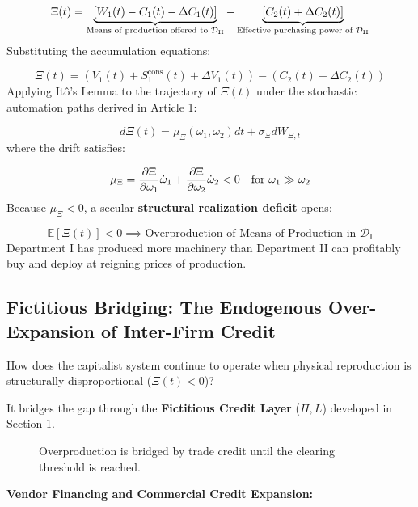\documentclass[11pt,letterpaper]{report}
\newcommand{\fitmath}[1]{\begingroup\setbox0=\hbox{$\displaystyle #1$}\ifdim\wd0>\linewidth\resizebox{\linewidth}{!}{$\displaystyle #1$}\else\displaystyle #1\fi\endgroup}
\begin{document}
\[\fitmath{\Xi(t) = \underbrace{\left[ W_1(t) - C_1(t) - \Delta C_1(t) \right]}_{\text{Means of production offered to } \mathcal{D}_{\text{II}}} - \underbrace{\left[ C_2(t) + \Delta C_2(t) \right]}_{\text{Effective purchasing power of } \mathcal{D}_{\text{II}}}}\]
Substituting the accumulation equations:

\[
\Xi (t)=\left({{V}_{1}(t)+{S}_{1}^{\mathrm{cons}}(t)+\Delta {V}_{1}(t)}\right)-\left({{C}_{2}(t)+\Delta {C}_{2}(t)}\right)
\]
Applying Itô's Lemma to the trajectory of $\Xi (t)$ under the stochastic automation paths derived in Article 1:

\[
d\Xi (t)={\mu }_{\Xi }({\omega }_{1},{\omega }_{2})dt+{\sigma }_{\Xi }d{W}_{\Xi ,t}
\]
where the drift satisfies:

\[\fitmath{{\mu }_{\Xi }=\frac{\partial \Xi }{\partial {\omega }_{1}}{\dot{\omega }}_{1}+\frac{\partial \Xi }{\partial {\omega }_{2}}{\dot{\omega }}_{2}<0\quad\text{for }{\omega }_{1}\gg {\omega }_{2}}\]
Because ${\mu }_{\Xi }<0$, a secular \textbf{structural realization deficit} opens:

\[
\mathbb{E}[\Xi(t)] < 0 \implies \text{Overproduction of Means of Production in } \mathcal{D}_{\text{I}}
\]
Department I has produced more machinery than Department II can profitably buy and deploy at reigning prices of production.

\subsection{Fictitious Bridging: The Endogenous Over-Expansion of Inter-Firm Credit}
How does the capitalist system continue to operate when physical reproduction is structurally disproportional ($\Xi (t)<0$)?

It bridges the gap through the \textbf{Fictitious Credit Layer} ($\Pi ,L$) developed in Section 1.

\begin{figure}[H]\centering
{}
\caption{Overproduction is bridged by trade credit until the clearing threshold is reached.}
\end{figure}
\textbf{Vendor Financing and Commercial Credit Expansion:}
\end{document}
